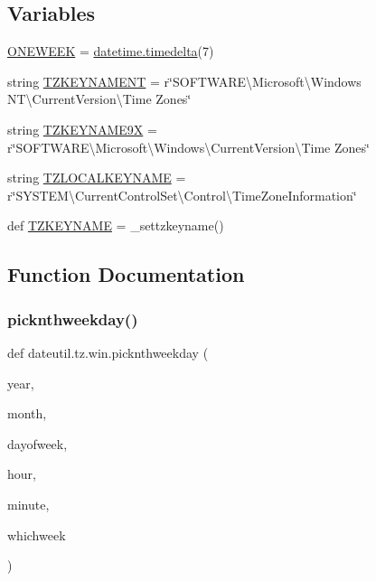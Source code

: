 \subsection*{Variables}
\begin{DoxyCompactItemize}
\item 
\hyperlink{namespacedateutil_1_1tz_1_1win_ad18e22949866f85aa1ec24d57b83c363}{O\+N\+E\+W\+E\+EK} = \hyperlink{noprefix_8h_ae6feacec25f59b525f6e0c442ef75ff7}{datetime.\+timedelta}(7)
\item 
string \hyperlink{namespacedateutil_1_1tz_1_1win_a2929c31a3f57c28a1f03e36fef2af1a5}{T\+Z\+K\+E\+Y\+N\+A\+M\+E\+NT} = r\char`\"{}S\+O\+F\+T\+W\+A\+R\+E\textbackslash{}\+Microsoft\textbackslash{}\+Windows N\+T\textbackslash{}\+Current\+Version\textbackslash{}\+Time Zones\char`\"{}
\item 
string \hyperlink{namespacedateutil_1_1tz_1_1win_a9d4528cc9b5335befb0c6da67c992999}{T\+Z\+K\+E\+Y\+N\+A\+M\+E9X} = r\char`\"{}S\+O\+F\+T\+W\+A\+R\+E\textbackslash{}\+Microsoft\textbackslash{}\+Windows\textbackslash{}\+Current\+Version\textbackslash{}\+Time Zones\char`\"{}
\item 
string \hyperlink{namespacedateutil_1_1tz_1_1win_ae51bc3cb5f92550ccb0d8769b99d6faf}{T\+Z\+L\+O\+C\+A\+L\+K\+E\+Y\+N\+A\+ME} = r\char`\"{}S\+Y\+S\+T\+E\+M\textbackslash{}\+Current\+Control\+Set\textbackslash{}\+Control\textbackslash{}\+Time\+Zone\+Information\char`\"{}
\item 
def \hyperlink{namespacedateutil_1_1tz_1_1win_a343950883d60f5ee69dfeea2789ac094}{T\+Z\+K\+E\+Y\+N\+A\+ME} = \+\_\+settzkeyname()
\end{DoxyCompactItemize}


\subsection{Function Documentation}
\mbox{\label{namespacedateutil_1_1tz_1_1win_abdff496f85b6c17802caf7217e1c6a99}} 
\subsubsection{\texorpdfstring{picknthweekday()}{picknthweekday()}}
{\footnotesize\ttfamily def dateutil.\+tz.\+win.\+picknthweekday (\begin{DoxyParamCaption}\item[{}]{year,  }\item[{}]{month,  }\item[{}]{dayofweek,  }\item[{}]{hour,  }\item[{}]{minute,  }\item[{}]{whichweek }\end{DoxyParamCaption})}

